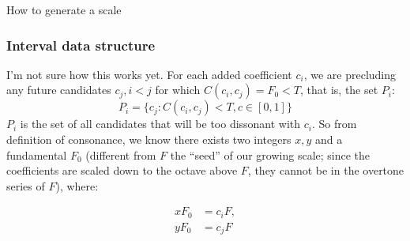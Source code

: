 \documentclass[letterpaper]{article}
\theoremstyle{definition}
\DeclarePairedDelimiter\floor{\lfloor}{\rfloor}
\begin{document}
{\begin{algorithm}[H]
\medskip
{}
\smallskip
{}
\smallskip
{}
\smallskip
{}
\smallskip
\medskip
 \caption{How to generate a scale}

\end{algorithm}

\subsubsection{Interval data structure}
I'm not sure how this works yet.  For each added coefficient $c_i$, we are precluding any future candidates $c_j, i<j$ for which $C(c_i, c_j)= F_0 < T$, that is, the set $P_i$:
\begin{equation}\label{eqnineq}
P_i = \{c_j: C(c_i, c_j) < T, c\in[0,1]\}
\end{equation}
$P_i$ is the set of all candidates that will be too dissonant with $c_i$. So from definition of consonance, we know there exists two integers $x, y$ and a fundamental $F_0$ (different from $F$ the ``seed'' of our growing scale; since the coefficients are scaled down to the octave above $F$, they cannot be in the overtone series of $F$), where:

\begin{align}
xF_0 &= c_iF,\\
yF_0 &= c_jF
\end{align}

}
\end{document}
